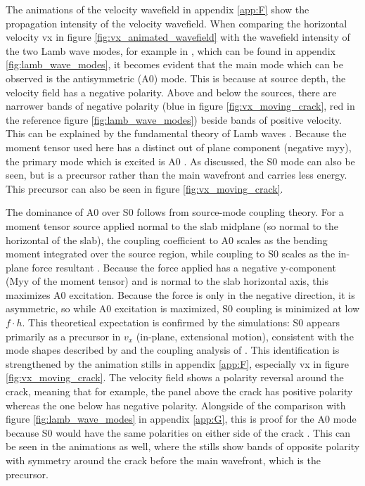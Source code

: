The animations of the velocity wavefield in appendix \ref{app:F} show the propagation intensity of the velocity wavefield. When comparing the horizontal velocity vx in figure \ref{fig:vx_animated_wavefield} with the wavefield intensity of the two Lamb wave modes, for example in \cite{cartaLambWavesDiscrete2023}, which can be found in appendix \ref{fig:lamb_wave_modes}, it becomes evident that the main mode which can be observed is the antisymmetric (A0) mode. This is because at source depth, the velocity field has a negative polarity. Above and below the sources, there are narrower bands of negative polarity (blue in figure \ref{fig:vx_moving_crack}, red in the reference figure \ref{fig:lamb_wave_modes}) beside bands of positive velocity. This can be explained by the fundamental theory of Lamb waves \parencite{lambWavesElasticPlate1917,roseWavesPlates2014}. Because the moment tensor used here has a distinct out of plane component (negative myy), the primary mode which is excited is A0 \parencite{roseWavesPlates2014}. As discussed, the S0 mode can also be seen, but is a precursor rather than the main wavefront and carries less energy. This precursor can also be seen in figure \ref{fig:vx_moving_crack}. \par 

The dominance of A0 over S0 follows from source-mode coupling theory. For a moment tensor source applied normal to the slab midplane (so normal to the horizontal of the slab), the coupling coefficient to A0 scales as the bending moment integrated over the source region, while coupling to S0 scales as the in-plane force resultant \parencite{roseWavesPlates2014, achenbachWavePropagationElastic2012}. Because the force applied has a negative y-component (Myy of the moment tensor) and is normal to the slab horizontal axis, this maximizes A0 excitation. Because the force is only in the negative direction, it is asymmetric, so while A0 excitation is maximized, S0 coupling is minimized at low \(f \cdot h\). This theoretical expectation is confirmed by the simulations: S0 appears primarily as a precursor in \(v_x\) (in-plane, extensional motion), consistent
with the mode shapes described by \textcite{lambWavesElasticPlate1917} and the coupling analysis of \textcite{roseWavesPlates2014}. This identification is strengthened by the animation stills in appendix \ref{app:F}, especially vx in figure \ref{fig:vx_moving_crack}. The velocity field shows a polarity reversal around the crack, meaning that for example, the panel above the crack has positive polarity whereas the one below has negative polarity. Alongside of the comparison with figure \ref{fig:lamb_wave_modes} in appendix \ref{app:G}, this is proof for the A0 mode because S0 would have the same polarities on either side of the crack \parencite{lambWavesElasticPlate1917}. This can be seen in the animations as well, where the stills show bands of opposite polarity with symmetry around the crack before the main wavefront, which is the precursor. \par



